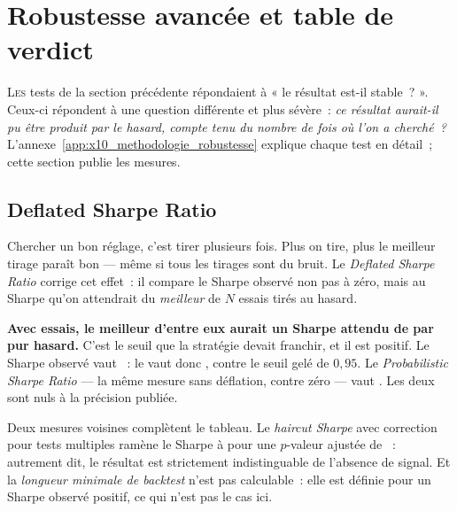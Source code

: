 \section{Robustesse avancée et table de verdict}
\label{sec:x10_robustesse}

\lettrine[lines=2, findent=2pt, nindent=0pt]{L}{es} tests de la section
précédente répondaient à « le résultat est-il stable~? ». Ceux-ci répondent à
une question différente et plus sévère~: \emph{ce résultat aurait-il pu être
produit par le hasard, compte tenu du nombre de fois où l'on a cherché~?}
L'annexe~\ref{app:x10_methodologie_robustesse} explique chaque test en
détail~; cette section publie les mesures.



\subsection{Deflated Sharpe Ratio}

Chercher un bon réglage, c'est tirer plusieurs fois. Plus on tire, plus le
meilleur tirage paraît bon --- même si tous les tirages sont du bruit. Le
\emph{Deflated Sharpe Ratio} corrige cet effet~: il compare le Sharpe observé
non pas à zéro, mais au Sharpe qu'on attendrait du \emph{meilleur} de $N$
essais tirés au hasard.

\begin{insightbox}
\textbf{Avec \XTenTrialsCount{} essais, le meilleur d'entre eux aurait un
Sharpe attendu de \metric{\XTenExpectedMaxSharpe} par pur hasard.} C'est le
seuil que la stratégie devait franchir, et il est positif. Le Sharpe observé
vaut \XTenSharpeIS~: le  vaut donc \metric{\XTenDSR}, contre le
seuil gelé de $0{,}95$. Le \emph{Probabilistic Sharpe Ratio} --- la même
mesure sans déflation, contre zéro --- vaut \XTenPSR. Les deux sont nuls à la
précision publiée.
\end{insightbox}

Deux mesures voisines complètent le tableau. Le \emph{haircut Sharpe} avec
correction pour tests multiples ramène le Sharpe à \XTenHaircutSharpe{} pour
une $p$-valeur ajustée de \XTenHaircutPValue~: autrement dit, le résultat est
strictement indistinguable de l'absence de signal. Et la \emph{longueur
minimale de backtest} n'est pas calculable~: elle est définie pour un Sharpe
observé positif, ce qui n'est pas le cas ici.

